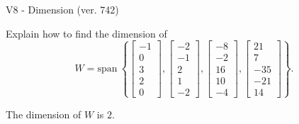 \begin{exercise}
  \begin{exerciseTitle}V8 - Dimension (ver. 742)\end{exerciseTitle}
  \begin{exerciseStatement}
    Explain how to find the dimension of 
\[W=\mathrm{span}\ \left\{\left[\begin{array}{r}
-1 \\
0 \\
3 \\
2 \\
0
\end{array}\right] , \left[\begin{array}{r}
-2 \\
-1 \\
2 \\
1 \\
-2
\end{array}\right] , \left[\begin{array}{r}
-8 \\
-2 \\
16 \\
10 \\
-4
\end{array}\right] , \left[\begin{array}{r}
21 \\
7 \\
-35 \\
-21 \\
14
\end{array}\right]\right\}.\]



  \end{exerciseStatement}
  \begin{exerciseAnswer}
   The dimension of \(W\) is  \(2\).
  


  \end{exerciseAnswer}
\end{exercise}